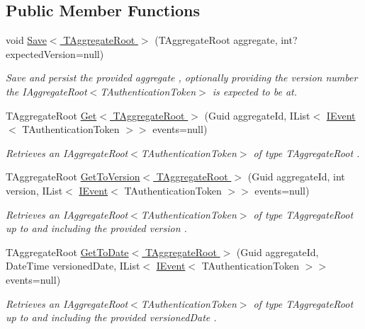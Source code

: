 \subsection*{Public Member Functions}
\begin{DoxyCompactItemize}
\item 
void \hyperlink{interfaceCqrs_1_1Domain_1_1IAggregateRepository_a306baf8aa6faabe893f93e5db5d3517d_a306baf8aa6faabe893f93e5db5d3517d}{Save$<$ T\+Aggregate\+Root $>$} (T\+Aggregate\+Root aggregate, int? expected\+Version=null)
\begin{DoxyCompactList}\small\item\em Save and persist the provided {\itshape aggregate} , optionally providing the version number the I\+Aggregate\+Root$<$\+T\+Authentication\+Token$>$ is expected to be at. \end{DoxyCompactList}\item 
T\+Aggregate\+Root \hyperlink{interfaceCqrs_1_1Domain_1_1IAggregateRepository_a890633fddbd05bd3b9e9968a2de095bb_a890633fddbd05bd3b9e9968a2de095bb}{Get$<$ T\+Aggregate\+Root $>$} (Guid aggregate\+Id, I\+List$<$ \hyperlink{interfaceCqrs_1_1Events_1_1IEvent}{I\+Event}$<$ T\+Authentication\+Token $>$$>$ events=null)
\begin{DoxyCompactList}\small\item\em Retrieves an I\+Aggregate\+Root$<$\+T\+Authentication\+Token$>$ of type {\itshape T\+Aggregate\+Root} . \end{DoxyCompactList}\item 
T\+Aggregate\+Root \hyperlink{interfaceCqrs_1_1Domain_1_1IAggregateRepository_aa0d6b4b9b117357e1676cae829fe2a5c_aa0d6b4b9b117357e1676cae829fe2a5c}{Get\+To\+Version$<$ T\+Aggregate\+Root $>$} (Guid aggregate\+Id, int version, I\+List$<$ \hyperlink{interfaceCqrs_1_1Events_1_1IEvent}{I\+Event}$<$ T\+Authentication\+Token $>$$>$ events=null)
\begin{DoxyCompactList}\small\item\em Retrieves an I\+Aggregate\+Root$<$\+T\+Authentication\+Token$>$ of type {\itshape T\+Aggregate\+Root}  up to and including the provided {\itshape version} . \end{DoxyCompactList}\item 
T\+Aggregate\+Root \hyperlink{interfaceCqrs_1_1Domain_1_1IAggregateRepository_a32308a27ce03c5d406e16b17430dd040_a32308a27ce03c5d406e16b17430dd040}{Get\+To\+Date$<$ T\+Aggregate\+Root $>$} (Guid aggregate\+Id, Date\+Time versioned\+Date, I\+List$<$ \hyperlink{interfaceCqrs_1_1Events_1_1IEvent}{I\+Event}$<$ T\+Authentication\+Token $>$$>$ events=null)
\begin{DoxyCompactList}\small\item\em Retrieves an I\+Aggregate\+Root$<$\+T\+Authentication\+Token$>$ of type {\itshape T\+Aggregate\+Root}  up to and including the provided {\itshape versioned\+Date} . \end{DoxyCompactList}\end{DoxyCompactItemize}


